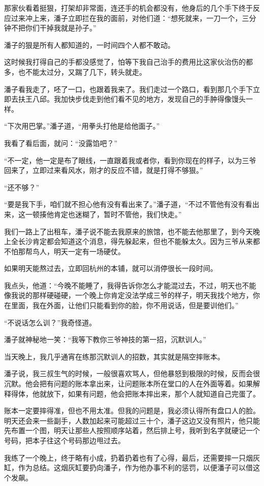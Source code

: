 那家伙看着挺狠，打架却非常面，连还手的机会都没有，他身后的几个手下终于反应过来冲上来，潘子立即拦在我的面前，对他们道：“想死就来，一刀一个，三分钟不把你们干掉我就是孙子。”

潘子的狠是所有人都知道的，一时间四个人都不敢动。

这时候我打得自己的手都没感觉了，怕等下我自己治手的费用比这家伙治伤的都多，也不能太过分，又踹了几下，转头就走。

潘子看我走了，呸了一口，也跟着我来了。我们走过一个路口，看到那几个手下立即去扶王八邱。我加快步伐走到他们看不见的地方，发现自己的手肿得像馒头一样。

“下次用巴掌。”潘子道，“用拳头打他是给他面子。”

我看了看后面，就问：“没露馅吧？”

“不一定，他一定是布了眼线，一直跟着我或者你，看到你现在的样子，以为三爷回来了，立即过来看风水，刚才的反应不错，就是打得不够狠。”

“还不够？”

“要是我下手，咱们就不担心他有没有看出来了。”潘子道，“不过不管他有没有看出来，这一顿揍他肯定也迷糊了，暂时不管他，我们快走。”

我们一路上了出租车，潘子说不能去我原来的旅馆，也不能去他那里了，到今天晚上全长沙肯定都会知道这个消息，得先躲起来，但也不能躲太久。因为三爷从来都不怕那帮鸟人，明天一定有一场硬仗。

如果明天能熬过去，立即回杭州的本铺，就可以消停很长一段时间。

我点头，他道：“今晚不能睡了，我得告诉你怎么才能混过去，不过，明天也不能像我说的那样硬碰硬，一个晚上你肯定没法学成三爷的样子，明天我找个地方，你在里面，我在外面，让他们只能看到你的脸，你不用说话，但是要训他们。”

“不说话怎么训？”我奇怪道。

潘子就神秘地一笑：“我等下教你三爷神技的第一招，沉默训人。”

当天晚上，我几乎通宵在练那沉默训人的招数，其实就是隔空摔账本。

潘子说，我三叔生气的时候，一般很喜欢骂人，但他暴怒到极限的时候，反而会很沉默。他会把有问题的账本拿出来，让问题账本所在堂口的人在外面等着。如果解释得体，他就放下，如果有问题，他会把账本摔出来，那个人就知道自己完蛋了。

账本一定要摔得准，但也不用太准。但我的问题是，我必须认得所有盘口人的脸。明天还会来一些副手，人数加起来可能超过三十个，潘子这边又没有照片，他只能先布置一个图，明天让那些人按照顺序站着，然后排上号，我听到名字就硬记一个号码，把本子往这个号码那边甩过去。

我练了一个晚上，终于略有小成，扔着扔着也有了心得，最后，还需要摔一只烟灰缸，作为总结。这烟灰缸要扔向潘子，作为他办事不利的惩罚，以便潘子可以借这个发飙。

